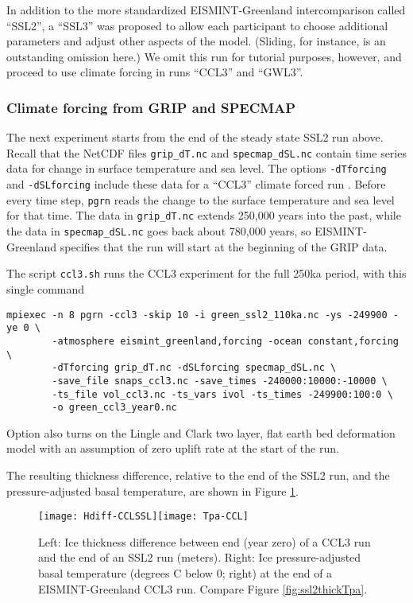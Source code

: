 In addition to the more standardized EISMINT-Greenland intercomparison called ``SSL2'', a ``SSL3'' was proposed to allow each participant to choose additional parameters and adjust other aspects of the model.  (Sliding, for instance, is an outstanding omission here.)  We omit this run for tutorial purposes, however, and proceed to use climate forcing in runs ``CCL3'' and ``GWL3''.


\subsubsection*{Climate forcing from GRIP and SPECMAP} 
\label{sec:climate-forcing}
The next experiment starts from the end of the steady state SSL2 run above.  Recall that the NetCDF files \texttt{grip_dT.nc} and \texttt{specmap_dSL.nc} contain time series data for change in surface temperature and sea level.  The options \texttt{-dTforcing} and \texttt{-dSLforcing} include these data for a ``CCL3'' climate forced run \cite{RitzEISMINT,HuybrechtsEISMINT}.  Before every time step, \texttt{pgrn} reads the change to the surface temperature and sea level for that time.  The data in \texttt{grip_dT.nc} extends 250,000 years into the past, while the data in \texttt{specmap_dSL.nc} goes back about 780,000 years, so EISMINT-Greenland specifies that the run will start at the beginning of the GRIP data.  

The script \texttt{ccl3.sh} runs the CCL3 experiment for the full 250ka period, with this single command
\begin{verbatim}
mpiexec -n 8 pgrn -ccl3 -skip 10 -i green_ssl2_110ka.nc -ys -249900 -ye 0 \
        -atmosphere eismint_greenland,forcing -ocean constant,forcing \
        -dTforcing grip_dT.nc -dSLforcing specmap_dSL.nc \
        -save_file snaps_ccl3.nc -save_times -240000:10000:-10000 \
        -ts_file vol_ccl3.nc -ts_vars ivol -ts_times -249900:100:0 \
        -o green_ccl3_year0.nc
\end{verbatim}
\noindent Option \intextoption{ccl3} also turns on the Lingle and Clark \cite{BLKfastearth,LingleClark} two layer, flat earth bed deformation model with an assumption of zero uplift rate at the start of the run.

The resulting thickness difference, relative to the end of the SSL2 run, and the pressure-adjusted basal temperature, are shown in Figure \ref{fig:cclthickTpa}.

\begin{figure}[ht]
\centering
\texttt{[image: Hdiff-CCLSSL]}\quad\texttt{[image: Tpa-CCL]}
\caption{Left:  Ice thickness difference between end (year zero) of a CCL3 run and the end of an SSL2 run (meters).  Right:  Ice pressure-adjusted basal temperature (degrees C below 0; right) at the end of a EISMINT-Greenland CCL3 run.  Compare Figure \ref{fig:ssl2thickTpa}.}
\label{fig:cclthickTpa}
\end{figure}

